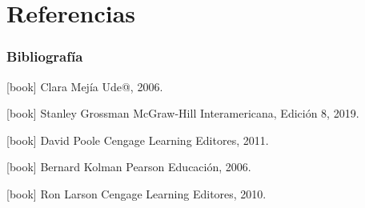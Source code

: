 \section{Referencias}

\begin{frame}\frametitle{Bibliografía}

\begin{thebibliography}{99}

[book]
Clara Mejía
\newblock Ude@, 2006.

\vspace{2mm}

[book]
Stanley Grossman
\newblock McGraw-Hill Interamericana, Edición 8, 2019. 

\vspace{2mm}

[book]
David Poole
\newblock Cengage Learning Editores, 2011. 

\vspace{2mm}

[book]
Bernard Kolman
\newblock Pearson Educación, 2006.

\vspace{2mm}

[book]
Ron Larson
\newblock Cengage Learning Editores, 2010. 

\end{thebibliography}


\end{frame}


